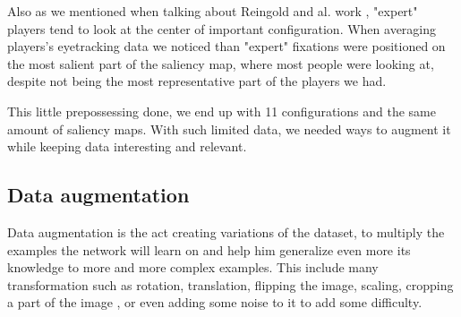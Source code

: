 Also as we mentioned when talking about Reingold  and al. work \cite{doi:10.1167/17.3.4,Charness2001}, "expert" players tend to look at the center of important configuration. When averaging players's eyetracking data we noticed than "expert" fixations were positioned on the most salient part of the saliency map, where most people were looking at, despite not being the most representative part of the players we had.

This little prepossessing done, we end up with 11 configurations and the same amount of saliency maps.
With such limited data, we needed ways to augment it while keeping data interesting and relevant.
\subsection{Data augmentation}
Data augmentation is the act creating variations of the dataset, to multiply the examples the network will learn on and help him generalize even more its knowledge to more and more complex examples. This include many transformation such as rotation, translation, flipping the image, scaling, cropping a part of the image , or even adding some noise to it to add some difficulty.

